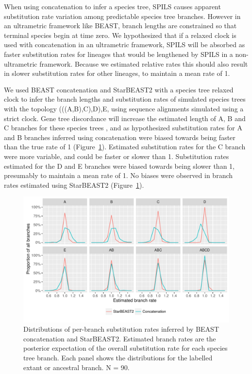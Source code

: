 \documentclass[12pt]{article}
\begin{document}
When using concatenation to infer a species tree, SPILS causes apparent
substitution rate variation among predictable species tree branches. However in
an ultrametric framework like BEAST, branch lengths are constrained so that
terminal species begin at time zero. We hypothesized that if a relaxed clock is
used with concatenation in an ultrametric framework, SPILS will be absorbed as
faster substitution rates for lineages that would be lengthened by SPILS in a
non-ultrametric framework. Because we estimated relative rates this should also
result in slower substitution rates for other lineages, to maintain a mean rate
of 1.

We used BEAST concatenation and StarBEAST2 with a species tree relaxed clock to
infer the branch lengths and substitution rates of simulated species trees with
the topology (((A,B),C),D),E, using sequence alignments simulated using a strict
clock. Gene tree discordance will increase the estimated length of A, B and C
branches for these species trees \citep{Mendes01072016}, and as hypothesized
substitution rates for A and B branches inferred using concatenation were biased
towards being faster than the true rate of 1 (Figure~\ref{fig:spilsRates}).
Estimated substitution rates for the C branch were more variable, and could be
faster or slower than 1. Substitution rates estimated for the D and E branches
were biased towards being slower than 1, presumably to maintain a mean rate of
1. No biases were observed in branch rates estimated using StarBEAST2
(Figure~\ref{fig:spilsRates}).

\begin{figure}[htb!]
\centering
\includegraphics[width=\textwidth]{spils.pdf}
\caption
{Distributions of per-branch substitution rates inferred by BEAST concatenation and StarBEAST2. Estimated branch
rates are the posterior expectation of the overall substitution rate for each
species tree branch. Each panel shows the distributions for the labelled extant or
ancestral branch. N = 90.}
\label{fig:spilsRates}
\end{figure}
\end{document}
